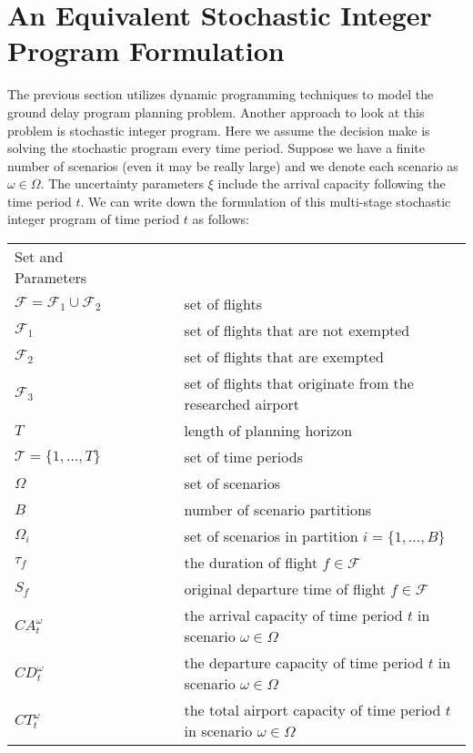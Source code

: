\documentclass[12pt]{article}
\begin{document}
\section{An Equivalent Stochastic Integer Program Formulation}\label{Model}
	The previous section utilizes dynamic programming techniques to model the ground delay program planning problem. Another approach to look at this problem is stochastic integer program. Here we assume the decision make is solving the stochastic program every time period. Suppose we have a finite number of scenarios (even it may be really large) and we denote each scenario as \(\omega \in \Omega\). The uncertainty parameters \(\xi\) include the arrival capacity following the time period \(t\). We can write down the formulation of this multi-stage stochastic integer program of time period \(t\) as follows:
	\begin{longtable}[H]{l l l}
		Set and Parameters & &\\
		\(\mathcal{F} = \mathcal{F}_1 \cup \mathcal{F}_2\) & \(\qquad\)& set of flights\\
		\(\mathcal{F}_1\) & \(\qquad\)& set of flights that are not exempted\\
		\(\mathcal{F}_2\) & \(\qquad\)& set of flights that are exempted\\
		\(\mathcal{F}_3\) & \(\qquad\)& set of flights that originate from the researched airport\\
		\(T\) & \(\qquad\) & length of planning horizon\\
		\(\mathcal{T} = \{1, \dots,T\}\) & \(\qquad\) & set of time periods\\
		\(\Omega\) & \(\qquad\) & set of scenarios\\
		\(B\) & \(\qquad\) & number of scenario partitions \\
		\(\Omega_i\) & \(\qquad\) & set of scenarios in partition \(i = \{1, \dots, B\}\)\\
		\(\tau_f\) & \(\qquad\) & the duration of flight \(f \in \mathcal{F}\)\\
		\(S_f\) & \(\qquad\) & original departure time of flight \(f\in \mathcal{F}\)\\
		\(CA_t^\omega\)  & \(\qquad\) & the arrival capacity of time period \(t\) in scenario \(\omega \in \Omega\)\\
		\(CD_t^\omega\)  & \(\qquad\) & the departure capacity of time period \(t\) in scenario \(\omega \in \Omega\)\\
		\(CT_t^\omega\)  & \(\qquad\) & the total airport capacity of time period \(t\) in scenario \(\omega \in \Omega\)\\

\end{longtable}
\end{document}
